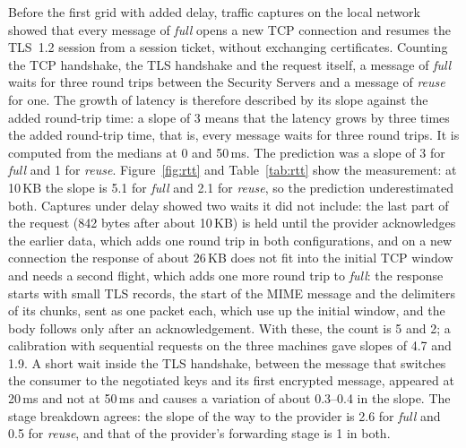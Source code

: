 \documentclass[conference,a4paper]{IEEEtran}
\newcommand{\newtext}[1]{{\color{blue}#1}}
\begin{document}
Before the first grid with added delay, traffic captures on the local network showed that every
message of \emph{full} opens a new TCP connection and resumes the TLS~1.2 session from a session
ticket, without exchanging certificates. Counting the TCP handshake, the TLS handshake and the
request itself, a message of \emph{full} waits for three round trips between the Security Servers
and a message of \emph{reuse} for one. The growth of latency is therefore described by its slope
against the added round-trip time: a slope of 3 means that the latency grows by three times the added
round-trip time, that is, every message waits for three round trips. It is computed from the medians at 0 and
50\,ms. The prediction was a slope of 3
for \emph{full} and 1 for \emph{reuse}. Figure~\ref{fig:rtt} and Table~\ref{tab:rtt} show the measurement: at 10\,KB the
slope is 5.1 for \emph{full} and 2.1 for \emph{reuse}, so the prediction underestimated both.
Captures under delay showed two waits it did not include: the last part of the request (842 bytes
after about 10\,KB) is held until the provider acknowledges the earlier data, which adds one round
trip in both configurations, and on a new connection the response of about 26\,KB does not fit into
the initial TCP window and needs a second flight, which adds one more round trip to \emph{full}\newtext{:
the response starts with small TLS records, the start of the MIME message and the delimiters of
its chunks, sent as one packet each, which use up the initial window, and the body follows only
after an acknowledgement}. With
these, the count is 5 and 2; a calibration with sequential requests on the three machines gave
slopes of 4.7 and 1.9. A short wait inside the TLS handshake, between the message that switches the
consumer to the negotiated keys and its first encrypted message, appeared at 20\,ms and not at
50\,ms and causes a variation of about 0.3--0.4 in the slope. The stage breakdown agrees: the slope of
the way to the provider is 2.6 for \emph{full} and 0.5 for \emph{reuse}, and that of the provider's
forwarding stage is 1 in both.
\end{document}
